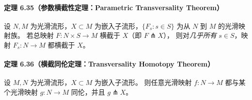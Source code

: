 \documentclass[11pt,a4paper]{article}
\begin{document}
\paragraph{定理 6.35（参数横截性定理：Parametric Transversality Theorem）}
设 $N,M$ 为光滑流形，$X\subset M$ 为嵌入子流形，$\{F_s:s\in S\}$ 为从 $N$ 到 $M$ 的光滑映射族。
若总映射 $F:N\times S\to M$ 横截于 $X$（即 $F\pitchfork X$），
则对\emph{几乎所有} $s\in S$，映射 $F_s:N\to M$ 都横截于 $X$。

\paragraph{定理 6.36（横截同伦定理：Transversality Homotopy Theorem）}
设 $M,N$ 为光滑流形，$X\subset M$ 为嵌入子流形。
则任意光滑映射 $f:N\to M$ 都与某个光滑映射 $g:N\to M$ 同伦，并且 $g\pitchfork X$。
\end{document}
